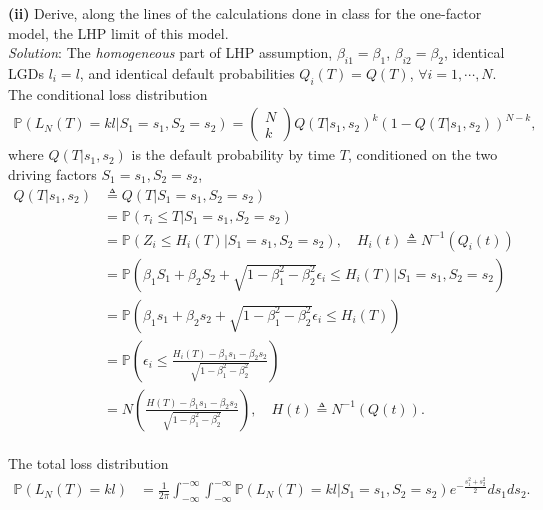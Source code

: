 \documentclass[paper=a4, fontsize=11pt]{scrartcl} %
\numberwithin{equation}{section} %
\numberwithin{figure}{section} %
\numberwithin{table}{section} %
\begin{document}
\textbf{(ii)} Derive, along the lines of the calculations done in class for the one-factor
model, the LHP limit of this model.\\
\textit{Solution}: The \textit{homogeneous} part of LHP assumption, $\beta_{i1}=\beta_1$, $\beta_{i2}=\beta_2$, identical LGDs $l_i = l$, and 
identical default probabilities $Q_i(T)=Q(T)$, $\forall i=1,\cdots,N$. 
The conditional loss distribution
\begin{align*}
\mathbb{P}\left(  L_N(T) = kl |S_1 = s_1, S_2 = s_2\right)
= \begin{pmatrix}
N\\ k
\end{pmatrix} Q(T|s_1,s_2)^k \left( 1- Q(T|s_1,s_2) \right)^{N-k},
\end{align*}
where $Q(T|s_1,s_2)$ is the default probability by time $T$, conditioned on the two driving factors $S_1=s_1, S_2=s_2$,
\begin{align*}
Q(T|s_1,s_2) &\triangleq Q(T|S_1=s_1,S_2=s_2)\\
&= \mathbb{P}(\tau_i \le T|S_1=s_1,S_2=s_2)\\
&= \mathbb{P}( Z_i \le H_i(T) |S_1=s_1,S_2=s_2), \quad H_i(t) \triangleq N^{-1}(Q_i(t))\\
&= \mathbb{P}\left( \beta_1 S_1 + \beta_2 S_2 + \sqrt{1-\beta_1^2 - \beta_2^2}\epsilon_i \le H_i(T) \bigg|S_1=s_1,S_2=s_2\right)\\
&= \mathbb{P}\left( \beta_1 s_1 + \beta_2 s_2 + \sqrt{1-\beta_1^2 - \beta_2^2}\epsilon_i \le H_i(T)\right)\\
&= \mathbb{P}\left(  \epsilon_i \le \frac{H_i(T) - \beta_1 s_1 - \beta_2 s_2}{\sqrt{1-\beta_1^2 - \beta_2^2}}\right)\\
&= N\left( \frac{H(T) - \beta_1 s_1 - \beta_2 s_2}{\sqrt{1-\beta_1^2 - \beta_2^2}} \right), \quad  H(t) \triangleq N^{-1}(Q(t)).
\end{align*}\\

The total loss distribution
\begin{align*}
\mathbb{P}\left(  L_N(T) = kl \right)
&= \frac{1}{2\pi}\int_{-\infty}^{-\infty}\int_{-\infty}^{-\infty} \mathbb{P}\left(  L_N(T) = kl |S_1 = s_1, S_2 = s_2\right)
e^{-\frac{s_1^2+s_2^2}{2}} ds_1 ds_2.
\end{align*}\\
\end{document}
